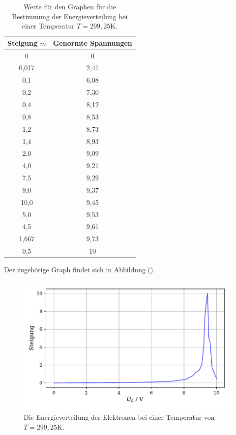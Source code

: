 \begin{table}[H]
  \centering
  \caption{Werte für den Graphen für die Bestimmung der Energieverteilung bei einer Temperatur $T=299,25$K.}
  \label{tab:Parameter}
  \begin{tabular}{c c}
    \toprule
    Steigung $m$ & Genormte Spannungen \\
    \bottomrule
    0 & 0\\
    0,017 & 2,41\\
    0,1 & 6,08\\
    0,2 &7,30\\
    0,4 &8,12\\
    0,8 &8,53\\
    1,2 &8,73\\
    1,4 &8,93\\
    2,0&9,09\\
    4,0 &9,21\\
    7,5 &9,29\\
    9,0 &9,37\\
    10,0 &9,45\\
    5,0 &9,53\\
    4,5 &9,61\\
    1,667&9,73\\
    0,5 & 10\\
    \bottomrule
  \end{tabular}
\end{table}

\noindent Der zugehörige Graph findet sich in Abbildung ().

\begin{figure}[H]
  \centering
  \includegraphics{plota1.pdf}
  \caption{Die Energieverteilung der Elektronen bei einer Temperatur von $T=299,25$K.}
  \label{fig:plot}
\end{figure}

